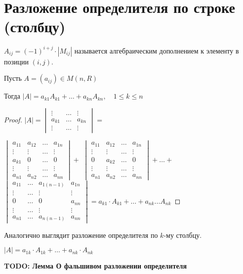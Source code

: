 \section{Разложение определителя по строке (столбцу)}

\begin{conj}
    $A_{ij} = (-1)^{i+j} \cdot |M_{ij}|$ называется алгебраическим
    дополнением к элементу в позиции $(i, j)$.
\end{conj}

\begin{theorem-non}
    Пусть $A = (a_{ij}) \in M(n, R)$

    Тогда $|A| = a_{k1}A_{k1} + \dots + a_{kn}A_{kn},\quad 1 \leqslant k \leqslant n$

    \begin{proof}
        $|A| =
        \begin{vmatrix}
            \vdots & \dots & \vdots \\
            a_{k1} & \dots & a_{kn} \\
            \vdots & \dots & \vdots
        \end{vmatrix} =$ 

        $\begin{vmatrix}
            a_{11} & a_{12} & \dots & a_{1n} \\
            \vdots & \vdots & \dots & \vdots \\
            a_{k1} & 0 & \dots & 0 \\
            \vdots & \vdots & \dots & \vdots \\
            a_{n1} & a_{n2} & \dots & a_{nn}
        \end{vmatrix} + $
        $\begin{vmatrix}
            a_{11} & a_{12} & \dots & a_{1n} \\
            \vdots & \vdots & \dots & \vdots \\
            0 & a_{k2} & \dots & 0 \\
            \vdots & \vdots & \dots & \vdots \\
            a_{n1} & a_{n2} & \dots & a_{nn}
        \end{vmatrix} + \dots + $
        $\begin{vmatrix}
            a_{11} & \dots & a_{1(n-1)} & a_{1n} \\
            \vdots & \dots & \vdots & \vdots \\
            0 & \dots & 0 & a_{nn} \\
            \vdots & \dots & \vdots & \vdots \\
            a_{n1} & \dots & a_{n(n-1)} & a_{nn}
        \end{vmatrix} = a_{k1}\cdot A_{k1} + \dots + a_{nk} \dots A_{nk}$
    \end{proof}
\end{theorem-non}

\notice Аналогично выглядит разложение определителя по $k$-му столбцу.

$|A| = a_{1k} \cdot A_{1k} + \dots + a_{nk} \cdot A_{nk}$

\textbf{TODO: Лемма О фальшивом разложении определителя}
